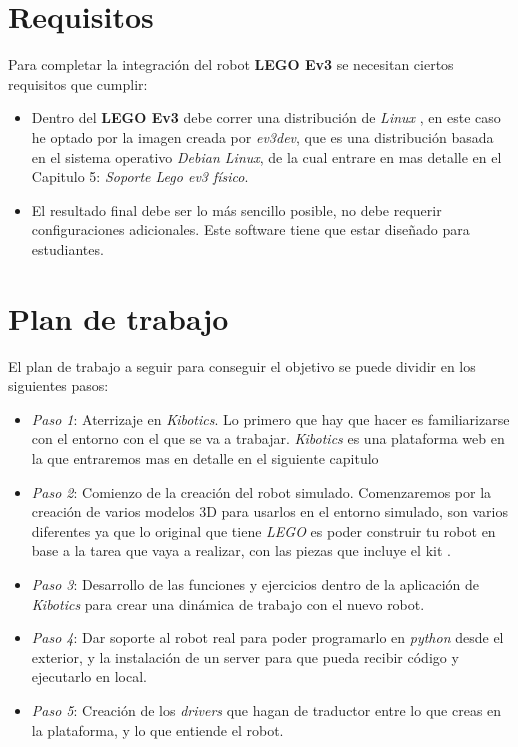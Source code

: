 \section{Requisitos}
\label{sec:requisitos}
Para completar la integración del robot \textbf{LEGO Ev3} se necesitan ciertos requisitos que cumplir:
\begin{itemize}
    \item Dentro del \textbf{LEGO Ev3} debe correr una distribución de \textit{Linux} , en este caso he optado por la imagen creada por \textit{ev3dev}, que es una distribución basada en el sistema operativo \textit{Debian Linux}, de la cual entrare en mas detalle en el Capitulo 5: \textit{Soporte Lego ev3 físico}.
    \item El resultado final debe ser lo más sencillo posible, no debe requerir configuraciones adicionales. Este software tiene que estar diseñado para estudiantes. 
\end{itemize}    

\section{Plan de trabajo}
\label{sec:plan}

El plan de trabajo a seguir para conseguir el objetivo se puede dividir en los siguientes pasos:
\begin{itemize}
    \item \textit{Paso 1}: Aterrizaje en \textit{Kibotics}. Lo primero que hay que hacer es familiarizarse con el entorno con el que se va a trabajar. \textit{Kibotics} es una plataforma web en la que entraremos mas en detalle en el siguiente capitulo 
    \item \textit{Paso 2}: Comienzo de la creación del robot simulado. Comenzaremos por la creación de varios modelos 3D para usarlos en el entorno simulado, son varios diferentes ya que lo original que tiene \textit{LEGO} es poder construir tu robot en base a la tarea que vaya a realizar, con las piezas que incluye el kit .
    \item \textit{Paso 3}: Desarrollo de las funciones y ejercicios dentro de la aplicación de \textit{Kibotics} para crear una dinámica de trabajo con el nuevo robot.
    \item \textit{Paso 4}: Dar soporte al robot real para poder programarlo en \textit{python} desde el exterior, y la instalación de un server para que pueda recibir código y ejecutarlo en local. 
    \item \textit{Paso 5}: Creación de los \textit{drivers} que hagan de traductor entre lo que creas en la plataforma, y lo que entiende el robot. 
\end{itemize}